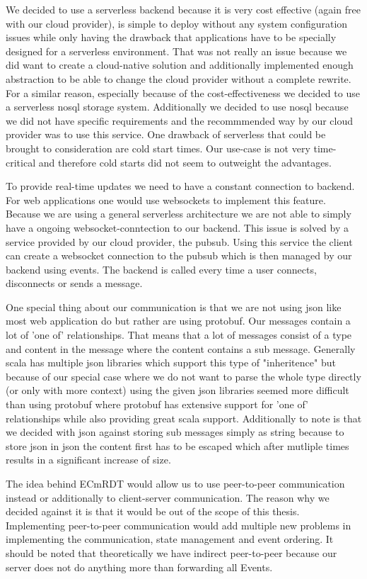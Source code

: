 \documentclass[
	ngerman,
	ruledheaders=section,   %
	class=report,		    %
	thesis={type=bachelor}, %
	accentcolor=9c,			%
	custommargins=true,    %
	marginpar=false,        %
	parskip=half-,          %
	fontsize=11pt,          %
]{tudapub}
\begin{document}
We decided to use a serverless backend because it is very cost effective (again free with our cloud provider), is simple to deploy without any system configuration issues while only having the drawback that applications have to be specially designed for a serverless environment. That was not really an issue because we did want to create a cloud-native solution and additionally implemented enough abstraction to be able to change the cloud provider without a complete rewrite. For a similar reason, especially because of the cost-effectiveness we decided to use a serverless nosql storage system. Additionally we decided to use nosql because we did not have specific requirements and the recommmended way by our cloud provider was to use this service. One drawback of serverless that could be brought to consideration are cold start times. Our use-case is not very time-critical and therefore cold starts did not seem to outweight the advantages.

To provide real-time updates we need to have a constant connection to backend. For web applications one would use websockets to implement this feature. Because we are using a general serverless architecture we are not able to simply have a ongoing websocket-conntection to our backend. This issue is solved by a service provided by our cloud provider, the pubsub. Using this service the client can create a websocket connection to the pubsub which is then managed by our backend using events. The backend is called every time a user connects, disconnects or sends a message.

One special thing about our communication is that we are not using json like most web application do but rather are using protobuf. Our messages contain a lot of 'one of' relationships. That means that a lot of messages consist of a type and content in the message where the content contains a sub message. Generally scala has multiple json libraries which support this type of "inheritence" but because of our special case where we do not want to parse the whole type directly (or only with more context) using the given json libraries seemed more difficult than using protobuf where protobuf has extensive support for 'one of' relationships while also providing great scala support. Additionally to note is that we decided with json against storing sub messages simply as string because to store json in json the content first has to be escaped which after mutliple times results in a significant increase of size.

The idea behind ECmRDT would allow us to use peer-to-peer communication instead or additionally to client-server communication. The reason why we decided against it is that it would be out of the scope of this thesis. Implementing peer-to-peer communication would add multiple new problems in implementing the communication, state management and event ordering. It should be noted that theoretically we have indirect peer-to-peer because our server does not do anything more than forwarding all Events.
\end{document}
